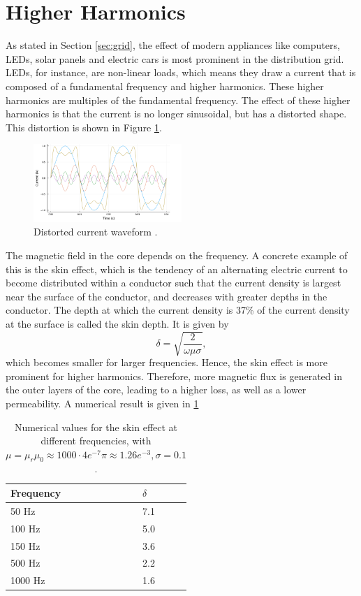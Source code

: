 \section{Higher Harmonics}
As stated in Section \ref{sec:grid}, the effect of modern appliances like computers, LEDs, solar panels and electric cars is most prominent in the distribution grid.
LEDs, for instance, are non-linear loads, which means they draw a current that is composed of a fundamental frequency and higher harmonics.
These higher harmonics are multiples of the fundamental frequency. The effect of these higher harmonics is that the current is no longer sinusoidal, but has a distorted shape.
This distortion is shown in Figure \ref{fig:higherharmonics}.
\begin{figure}[H]
    \centering
    \includegraphics[width=0.5\textwidth]{img/higher_harmonics.png}
    \caption{Distorted current waveform \cite{vanDijk2022}.}
    \label{fig:higherharmonics}
\end{figure}
The magnetic field in the core depends on the frequency. A concrete example of this is the skin effect, which is the tendency of an alternating electric current to become distributed within a conductor 
such that the current density is largest near the surface of the conductor, and decreases with greater depths in the conductor.
The depth at which the current density is 37\% of the current density at the surface is called the skin depth. It is given by \cite{domenico}
\begin{equation}
    \delta = \sqrt{\frac{2}{\omega \mu \sigma}},
\end{equation}
which becomes smaller for larger frequencies. Hence, the skin effect is more prominent for higher harmonics. Therefore, more magnetic flux is generated in the outer layers of the core, leading to a higher loss, as well as a lower permeability. A numerical result is given in \cref{tab:skin_effect}

\begin{table}
    \centering
    \begin{tabular}{l|l}
        Frequency & $\delta$ \\
        \hline
        50 Hz   & 7.1 \\
        100 Hz  & 5.0 \\
        150 Hz  & 3.6 \\
        500 Hz  & 2.2 \\
        1000 Hz & 1.6 \\
    \end{tabular}
    \caption{Numerical values for the skin effect at different frequencies, with $\mu = \mu_r\mu_0 \approx 1000 \cdot 4e^{-7} \pi \approx 1.26e^{-3}, \sigma = 0.1$.}
    \label{tab:skin_effect}
\end{table}


